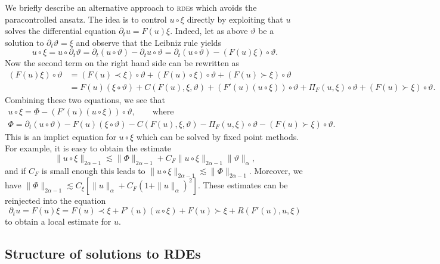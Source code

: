 \documentclass[11pt,a4paper]{article}
\theoremstyle{remark}
\begin{document}
We briefly describe an alternative approach to \textsc{rde}s which avoids the
paracontrolled ansatz. The idea is to control $u \circ   \xi$ directly by
exploiting that $u$ solves the differential equation $\partial_{t} u=F ( u ) \xi$. Indeed, let as above $\vartheta$ be a solution to $\partial_{t} \vartheta = \xi$ and observe that the Leibniz rule yields
\[
   u \circ   \xi =u \circ   \partial_{t} \vartheta = \partial_{t} ( u \circ  \vartheta ) - \partial_{t} u \circ \vartheta = \partial_{t} ( u \circ   \vartheta ) - ( F ( u ) \xi ) \circ   \vartheta.
\]
Now the second term on the right hand side can be rewritten as
\begin{align*}
   ( F ( u ) \xi ) \circ   \vartheta & = ( F ( u ) \prec \xi ) \circ   \vartheta + ( F ( u ) \circ \xi ) \circ   \vartheta + ( F ( u ) \succ \xi ) \circ  \vartheta \\
   & =F ( u ) ( \xi \circ   \vartheta ) +C ( F ( u ) , \xi , \vartheta ) + ( F'( u ) ( u \circ   \xi ) ) \circ   \vartheta + \Pi_{F} ( u, \xi ) \circ  \vartheta + ( F ( u ) \succ \xi ) \circ   \vartheta.
\end{align*}
Combining these two equations, we see that
\begin{gather*}
   u \circ   \xi = \Phi - ( F' ( u ) ( u \circ   \xi ) ) \circ   \vartheta , \qquad \text{where} \\
   \Phi = \partial_{t} ( u \circ   \vartheta ) -F ( u ) ( \xi \circ \vartheta ) -C ( F ( u ) , \xi , \vartheta ) - \Pi_{F} ( u, \xi ) \circ \vartheta - ( F ( u ) \succ \xi ) \circ   \vartheta.
\end{gather*}
This is an implict equation for $u \circ   \xi$ which can be solved by fixed point methods. For example, it is easy to obtain the estimate
\[
   \| u \circ   \xi \|_{2 \alpha -1} \lesssim \| \Phi \|_{2 \alpha -1} +C_{F} \| u \circ   \xi \|_{2 \alpha -1} \| \vartheta \|_{\alpha},
\]
and if $C_{F}$ is small enough this leads to $\| u \circ   \xi \|_{2 \alpha -1} \lesssim \| \Phi \|_{2 \alpha -1}$. Moreover, we have $\| \Phi \|_{2 \alpha -1} \lesssim C_{\xi} [ \| u \|_{\alpha} +C_{F} ( 1+ \| u \|_{\alpha} )^{2} ]$. These estimates can be
reinjected into the equation
\[
   \partial_{t} u=F ( u ) \xi =F ( u ) \prec \xi +F' ( u ) ( u \circ   \xi ) +F ( u ) \succ \xi +R ( F' ( u ) ,u, \xi )
\]
to obtain a local estimate for $u$.

\subsection{Structure of solutions to RDEs}
\end{document}
